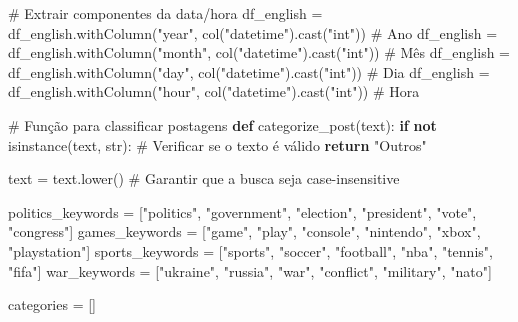 \documentclass[
  letterpaper,
  DIV=11,
  numbers=noendperiod]{scrartcl}
\newenvironment{Shaded}{\begin{snugshade}}{\end{snugshade}}
\newcommand{\BuiltInTok}[1]{\textcolor[rgb]{0.00,0.23,0.31}{#1}}
\newcommand{\CommentTok}[1]{\textcolor[rgb]{0.37,0.37,0.37}{#1}}
\newcommand{\ControlFlowTok}[1]{\textcolor[rgb]{0.00,0.23,0.31}{\textbf{#1}}}
\newcommand{\KeywordTok}[1]{\textcolor[rgb]{0.00,0.23,0.31}{\textbf{#1}}}
\newcommand{\NormalTok}[1]{\textcolor[rgb]{0.00,0.23,0.31}{#1}}
\newcommand{\OperatorTok}[1]{\textcolor[rgb]{0.37,0.37,0.37}{#1}}
\newcommand{\StringTok}[1]{\textcolor[rgb]{0.13,0.47,0.30}{#1}}
\begin{document}
\begin{Shaded}
\begin{Highlighting}[]
\CommentTok{\# Extrair componentes da data/hora}
\NormalTok{df\_english }\OperatorTok{=}\NormalTok{ df\_english.withColumn(}\StringTok{"year"}\NormalTok{, col(}\StringTok{"datetime"}\NormalTok{).cast(}\StringTok{"int"}\NormalTok{))       }\CommentTok{\# Ano}
\NormalTok{df\_english }\OperatorTok{=}\NormalTok{ df\_english.withColumn(}\StringTok{"month"}\NormalTok{, col(}\StringTok{"datetime"}\NormalTok{).cast(}\StringTok{"int"}\NormalTok{))      }\CommentTok{\# Mês}
\NormalTok{df\_english }\OperatorTok{=}\NormalTok{ df\_english.withColumn(}\StringTok{"day"}\NormalTok{, col(}\StringTok{"datetime"}\NormalTok{).cast(}\StringTok{"int"}\NormalTok{))        }\CommentTok{\# Dia}
\NormalTok{df\_english }\OperatorTok{=}\NormalTok{ df\_english.withColumn(}\StringTok{"hour"}\NormalTok{, col(}\StringTok{"datetime"}\NormalTok{).cast(}\StringTok{"int"}\NormalTok{))       }\CommentTok{\# Hora}

\CommentTok{\# Função para classificar postagens}
\KeywordTok{def}\NormalTok{ categorize\_post(text):}
    \ControlFlowTok{if} \KeywordTok{not} \BuiltInTok{isinstance}\NormalTok{(text, }\BuiltInTok{str}\NormalTok{):  }\CommentTok{\# Verificar se o texto é válido}
        \ControlFlowTok{return} \StringTok{"Outros"}
    
\NormalTok{    text }\OperatorTok{=}\NormalTok{ text.lower()  }\CommentTok{\# Garantir que a busca seja case{-}insensitive}
    
\NormalTok{    politics\_keywords }\OperatorTok{=}\NormalTok{ [}\StringTok{"politics"}\NormalTok{, }\StringTok{"government"}\NormalTok{, }\StringTok{"election"}\NormalTok{, }\StringTok{"president"}\NormalTok{, }\StringTok{"vote"}\NormalTok{, }\StringTok{"congress"}\NormalTok{]}
\NormalTok{    games\_keywords }\OperatorTok{=}\NormalTok{ [}\StringTok{"game"}\NormalTok{, }\StringTok{"play"}\NormalTok{, }\StringTok{"console"}\NormalTok{, }\StringTok{"nintendo"}\NormalTok{, }\StringTok{"xbox"}\NormalTok{, }\StringTok{"playstation"}\NormalTok{]}
\NormalTok{    sports\_keywords }\OperatorTok{=}\NormalTok{ [}\StringTok{"sports"}\NormalTok{, }\StringTok{"soccer"}\NormalTok{, }\StringTok{"football"}\NormalTok{, }\StringTok{"nba"}\NormalTok{, }\StringTok{"tennis"}\NormalTok{, }\StringTok{"fifa"}\NormalTok{]}
\NormalTok{    war\_keywords }\OperatorTok{=}\NormalTok{ [}\StringTok{"ukraine"}\NormalTok{, }\StringTok{"russia"}\NormalTok{, }\StringTok{"war"}\NormalTok{, }\StringTok{"conflict"}\NormalTok{, }\StringTok{"military"}\NormalTok{, }\StringTok{"nato"}\NormalTok{]}
    
\NormalTok{    categories }\OperatorTok{=}\NormalTok{ []}
    

\end{Highlighting}
\end{Shaded}
\end{document}
